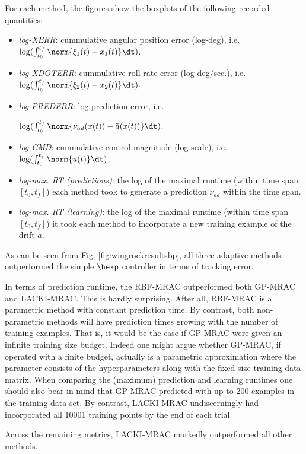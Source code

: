 	
	For each method, the figures show the boxplots of the following recorded quantities: 
	\begin{itemize}
		\item \textit{log-XERR}: cummulative angular position error (log-deg), i.e. $\log(\int_{t_0}^{t_f} \norm{\xi_1(t) - x_1 (t)} \dt )$.
		\item \textit{log-XDOTERR}:  cummulative roll rate error (log-deg/sec.), i.e. $\log(\int_{t_0}^{t_f} \norm{\xi_2(t) - x_2 (t)} \dt )$.
		\item \textit{log-PREDERR}: log-prediction error, i.e. 
		
		$\log(\int_{t_0}^{t_f} \norm{\nu_{ad}(x(t)) - \tilde a(x(t))} \dt )$.
		\item \textit{log-CMD}: cummulative control magnitude (log-scale), i.e. $\log(\int_{t_0}^{t_f} \norm{u(t)} \dt )$.
		\item \textit{log-max. RT (predictions)}: the log of the maximal runtime (within time span $[t_0,t_f]$) each method took to generate a prediction $\nu_{ad}$ within the time span.
		\item \textit{log-max. RT (learning)}: the log of the maximal runtime (within time span $[t_0,t_f]$) it took each method to incorporate a new training example of the drift $\tilde a$.
	\end{itemize}
	
	As can be seen from Fig. \ref{fig:wingrockresultsbp}, all three adaptive methods outperformed the simple $\hexp$ controller in terms of tracking error. 
	
	In terms of prediction runtime, the RBF-MRAC outperformed both GP-MRAC and LACKI-MRAC. This is hardly surprising. After all, RBF-MRAC is a parametric method with constant prediction time. By contrast, both non-parametric methods will have prediction times growing with the number of training examples.
That is, it would be the case if GP-MRAC were given an infinite training size budget. Indeed one might argue whether GP-MRAC, if operated with a finite budget, actually is a parametric approximation where the parameter consists of the hyperparameters along with the fixed-size training data matrix. When comparing the (maximum) prediction and learning runtimes one should also bear in mind that GP-MRAC predicted with up to 200 examples in the training data set. By contrast, LACKI-MRAC undiscerningly had incorporated all 10001 training points by the end of each trial.

Across the remaining metrics, LACKI-MRAC markedly outperformed all other methods.

